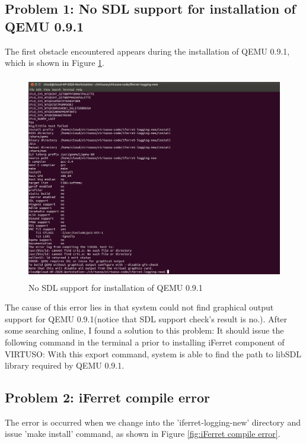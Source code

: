 \subsection{Problem 1: No SDL support for installation of QEMU 0.9.1}
The first obstacle encountered appears during the installation of QEMU 0.9.1, which is shown in Figure \ref{fig:No SDL support for installation of QEMU 0.9.1}.

\begin{figure}[htbp]
	\centering
		\includegraphics[width=14cm, height= 9cm ]{Figures/Figure32.png}
	\caption[No SDL support for installation of QEMU 0.9.1]{No SDL support for installation of QEMU 0.9.1}
	\label{fig:No SDL support for installation of QEMU 0.9.1}
\end{figure}

The cause of this error lies in that system could not find graphical output support for QEMU 0.9.1(notice that SDL support check's 
result is no.). After some searching online, I found a solution to this problem: It should issue the following command in the terminal a prior to
installing iFerret component of VIRTUSO:
With this export command, system is able to find the path to libSDL library required by QEMU 0.9.1.


\subsection{Problem 2: iFerret compile error}
The error is occurred when we change into the 'iferret-logging-new' directory and issue 'make install' command, as shown in Figure 
\ref{fig:iFerret compile error}.

